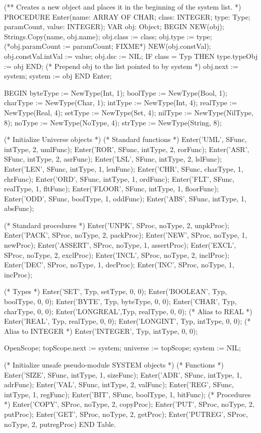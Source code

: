 \documentclass[utf8]{lgu}
\begin{document}
\begin{modula2long}
(** Creates a new object and places it in the beginning of the system list. *)
PROCEDURE Enter(name: ARRAY OF CHAR; class: INTEGER;
  type: Type; paramCount, value: INTEGER);
VAR obj: Object;
BEGIN
  NEW(obj);
  Strings.Copy(name, obj.name);
  obj.class := class;
  obj.type := type;
  (*obj.paramCount := paramCount; FIXME*)
  NEW(obj.constVal);
  obj.constVal.intVal := value;
  obj.dsc := NIL;
  IF class = Typ THEN
    type.typeObj := obj
  END;
  (* Prepend obj to the list pointed to by system *)
  obj.next := system;
  system := obj
END Enter;

BEGIN
  byteType := NewType(Int,     1);
  boolType := NewType(Bool,    1);
  charType := NewType(Char,    1);
  intType   := NewType(Int,     4);
  realType := NewType(Real,    4);
  setType  := NewType(Set,     4);
  nilType   := NewType(NilType, 8);
  noType   := NewType(NoType,  4);
  strType  := NewType(String,   8);

  (* Initialize Universe objects *)
  (* Standard functions *)
  Enter('UML',     SFunc, intType,  2, umlFunc);
  Enter('ROR',     SFunc, intType,  2, rorFunc);
  Enter('ASR',     SFunc, intType,  2, asrFunc);
  Enter('LSL',     SFunc, intType,  2, lslFunc);
  Enter('LEN',     SFunc, intType,  1, lenFunc);
  Enter('CHR',     SFunc, charType, 1, chrFunc);
  Enter('ORD',     SFunc, intType,  1, ordFunc);
  Enter('FLT',     SFunc, realType, 1, fltFunc);
  Enter('FLOOR',   SFunc, intType,  1, floorFunc);
  Enter('ODD',     SFunc, boolType, 1, oddFunc);
  Enter('ABS',     SFunc, intType,  1, absFunc);

  (* Standard procedures *)
  Enter('UNPK',    SProc, noType,   2, unpkProc);
  Enter('PACK',    SProc, noType,   2, packProc);
  Enter('NEW',     SProc, noType,   1, newProc);
  Enter('ASSERT', SProc, noType,   1, assertProc);
  Enter('EXCL',    SProc, noType,   2, exclProc);
  Enter('INCL',     SProc, noType,   2, inclProc);
  Enter('DEC',     SProc, noType,   1, decProc);
  Enter('INC',      SProc, noType,   1, incProc);

  (* Types *)
  Enter('SET',      Typ,   setType,  0, 0);
  Enter('BOOLEAN', Typ,   boolType, 0, 0);
  Enter('BYTE',     Typ,   byteType, 0, 0);
  Enter('CHAR',     Typ,   charType, 0, 0);
  Enter('LONGREAL',Typ,   realType, 0, 0); (* Alias to REAL *)
  Enter('REAL',     Typ,   realType, 0, 0);
  Enter('LONGINT',  Typ,   intType,  0, 0); (* Alias to INTEGER *)
  Enter('INTEGER',  Typ,   intType,  0, 0);

  OpenScope;
  topScope.next := system;
  universe := topScope;
  system := NIL;

  (* Initialize unsafe pseudo-module SYSTEM objects *)
  (* Functions *)
  Enter('SIZE',  SFunc, intType,  1, sizeFunc);
  Enter('ADR',  SFunc, intType,   1, adrFunc);
  Enter('VAL',  SFunc, intType,   2, valFunc);
  Enter('REG',  SFunc, intType,   1, regFunc);
  Enter('BIT',   SFunc, boolType, 1, bitFunc);
  (* Procedures *)
  Enter('COPY',    SProc, noType, 2, copyProc);
  Enter('PUT',     SProc, noType, 2, putProc);
  Enter('GET',     SProc, noType, 2, getProc);
  Enter('PUTREG', SProc, noType, 2, putregProc)
END Table.
\end{modula2long}
\end{document}
